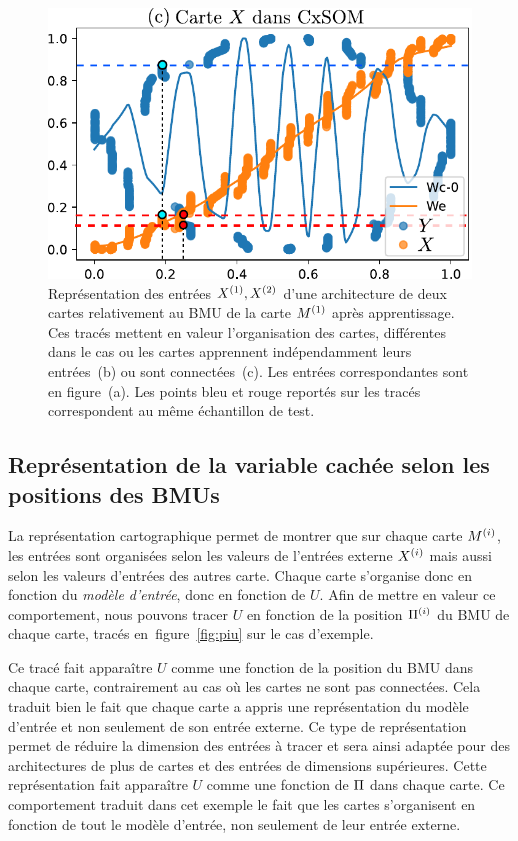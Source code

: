 \documentclass[../main]{subfiles}
\begin{document}
\begin{figure}
\begin{minipage}{0.38\textwidth}
\includegraphics[width=\textwidth]{weights_2som.pdf}
\end{minipage}

\caption{Représentation des entrées $X^{({1})},X^{({2})}$ d'une architecture de deux cartes relativement au BMU de la carte $M^{({1})}$ après apprentissage. Ces tracés mettent en valeur l'organisation des cartes, différentes dans le cas ou les cartes apprennent indépendamment leurs entrées~(b) ou sont connectées~(c). Les entrées correspondantes sont en figure~(a). Les points bleu et rouge reportés sur les tracés correspondent au même échantillon de test.\label{fig:inputs}}
\end{figure}

\subsection{Représentation de la variable cachée selon les positions des BMUs}

La représentation cartographique permet de montrer que sur chaque carte $M^{({i})}$, les entrées sont organisées selon les valeurs de l'entrées externe $X^{({i})}$ mais aussi selon les valeurs d'entrées des autres carte. Chaque carte s'organise donc en fonction du \emph{modèle d'entrée}, donc en fonction de $U$.
Afin de mettre en valeur ce comportement, nous pouvons tracer $U$ en fonction de la position $\Pi^{({i})}$ du BMU de chaque carte, tracés en~figure~\ref{fig:piu} sur le cas d'exemple.

Ce tracé fait apparaître $U$ comme une fonction de la position du BMU dans chaque carte, contrairement au cas où les cartes ne sont pas connectées. 
Cela traduit bien le fait que chaque carte a appris une représentation du modèle d'entrée et non seulement de son entrée externe.
Ce type de représentation permet de réduire la dimension des entrées à tracer et sera ainsi adaptée pour des architectures de plus de cartes et des entrées de dimensions supérieures.
Cette représentation fait apparaître $U$ comme une fonction de $\Pi$ dans chaque carte. Ce comportement traduit dans cet exemple le fait que les cartes s'organisent en fonction de tout le modèle d'entrée, non seulement de leur entrée externe.
\end{document}
